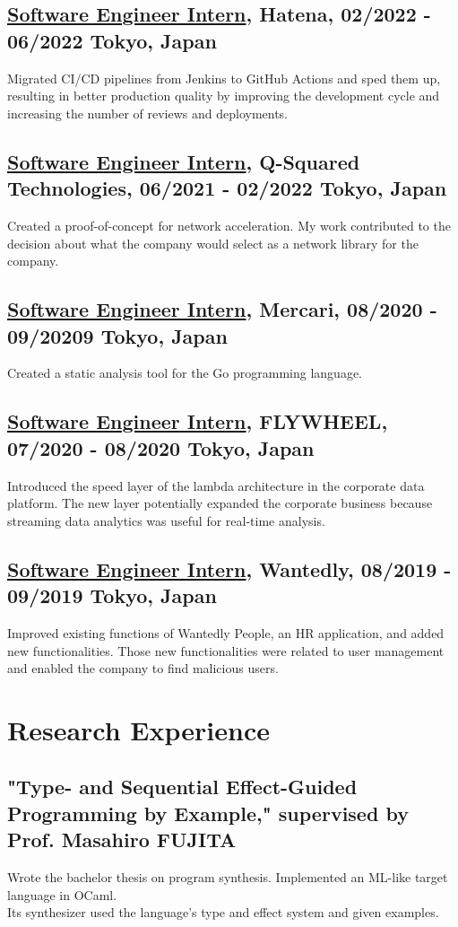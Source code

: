 \documentclass[10pt]{article}
\begin{document}
  \subsection*{\underline{Software Engineer Intern}, Hatena, 02/2022 - 06/2022 \hfill Tokyo, Japan}
    Migrated CI/CD pipelines from Jenkins to GitHub Actions and sped them up, resulting in better production quality by improving the development cycle and increasing the number of reviews and deployments.
  \subsection*{\underline{Software Engineer Intern}, Q-Squared Technologies, 06/2021 - 02/2022 \hfill Tokyo, Japan}
    Created a proof-of-concept for network acceleration.
    My work contributed to the decision about what the company would select as a network library for the company.
  \subsection*{\underline{Software Engineer Intern}, Mercari, 08/2020 - 09/20209 \hfill Tokyo, Japan}
    Created a static analysis tool for the Go programming language.
  \subsection*{\underline{Software Engineer Intern}, FLYWHEEL, 07/2020 - 08/2020 \hfill Tokyo, Japan}
    Introduced the speed layer of the lambda architecture in the corporate data platform.
    The new layer potentially expanded the corporate business because streaming data analytics was useful for real-time analysis.
  \subsection*{\underline{Software Engineer Intern}, Wantedly, 08/2019 - 09/2019 \hfill Tokyo, Japan}
    Improved existing functions of Wantedly People, an HR application, and added new functionalities.
    Those new functionalities were related to user management and enabled the company to find malicious users.

\section*{Research Experience}
  \subsection*{"Type- and Sequential Effect-Guided Programming by Example," supervised by Prof. Masahiro FUJITA}
    Wrote the bachelor thesis on program synthesis.
    Implemented an ML-like target language in OCaml.
    \\
    Its synthesizer used the language's type and effect system and given examples.
\end{document}
